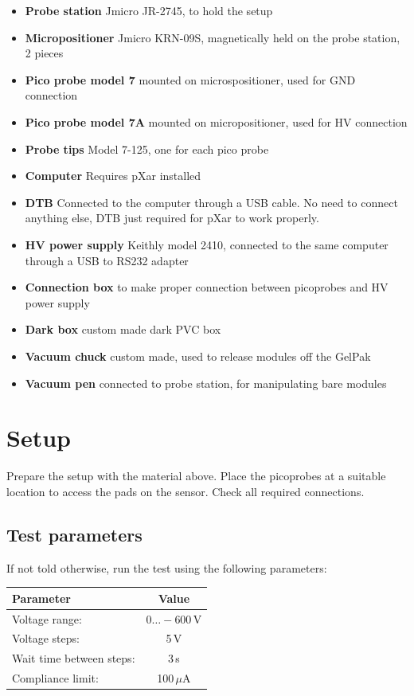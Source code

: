 \documentclass[10pt]{unlsilabsop}
\begin{document}
\begin{itemize}
\item \textbf{Probe station} Jmicro JR-2745, to hold the setup
\item \textbf{Micropositioner} Jmicro KRN-09S, magnetically held on the probe station, 2 pieces
\item \textbf{Pico probe model 7} mounted on microspositioner, used for GND connection
\item \textbf{Pico probe model 7A} mounted on micropositioner, used for HV connection
\item \textbf{Probe tips} Model 7-125, one for each pico probe
\item \textbf{Computer} Requires pXar installed
\item \textbf{DTB} Connected to the computer through a USB cable. No need to connect anything else, DTB just required for pXar to work properly.
\item \textbf{HV power supply} Keithly model 2410, connected to the same computer through a USB to RS232 adapter
\item \textbf{Connection box} to make proper connection between picoprobes and HV power supply
\item \textbf{Dark box} custom made dark PVC box
\item \textbf{Vacuum chuck} custom made, used to release modules off the GelPak
\item \textbf{Vacuum pen} connected to probe station, for manipulating bare modules
\end{itemize}

\section{Setup}

Prepare the setup with the material above. Place the picoprobes at a suitable location to access the pads on the sensor. Check all required connections.

\subsection{Test parameters}

If not told otherwise, run the test using the following parameters:

\bigskip

\begin{tabular}{lc}
\toprule
Parameter & Value \\
\midrule
Voltage range: & $0\dots-600$\,V \\
Voltage steps: & 5\,V \\
Wait time between steps: & 3\,s \\
Compliance limit: & 100\,$\mu$A \\
\bottomrule
\end{tabular}
\end{document}
